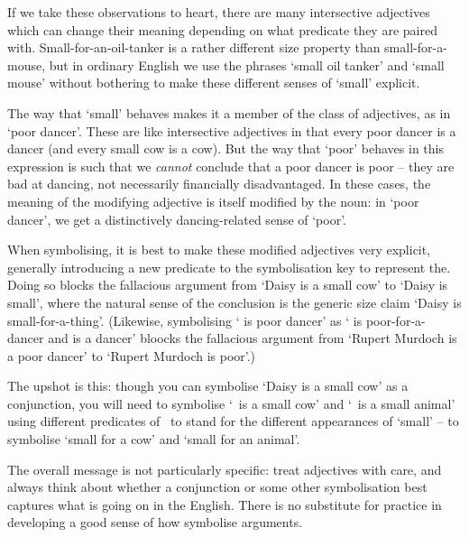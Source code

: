 If we take these observations to heart, there are many intersective adjectives which can change their meaning depending on what predicate they are paired with. Small-for-an-oil-tanker is a rather different size property than small-for-a-mouse, but in ordinary English we use the phrases `small oil tanker' and `small mouse' without bothering to make these different senses of `small' explicit. 

The way that `small' behaves makes it a member of the class of  adjectives, as in `poor dancer'. These are like intersective adjectives in that every poor dancer is a dancer (and every small cow is a cow). But the way that `poor' behaves in this expression is such that we \emph{cannot} conclude that a poor dancer is poor – they are bad at dancing, not necessarily financially disadvantaged. In these cases, the meaning of the modifying adjective is itself modified by the noun: in `poor dancer', we get a distinctively dancing-related sense of `poor'.   

When symbolising, it is best to make these modified adjectives  very explicit, generally introducing a new predicate to the symbolisation key to represent the. Doing so blocks the fallacious argument from `Daisy is a small cow' to `Daisy is small', where the natural sense of the conclusion is the generic size claim `Daisy is small-for-a-thing'. (Likewise, symbolising `\gap{} is poor dancer' as `\gap{} is poor-for-a-dancer and \gap{} is a dancer' bloocks the fallacious argument from `Rupert Murdoch is a poor dancer' to `Rupert Murdoch is poor'.)

The upshot is this: though you can symbolise `Daisy is a small cow' as a conjunction, you will need to symbolise `\blank\ is a small cow' and `\blank\ is a small animal' using different predicates of \FOL\ to stand for the different appearances of `small' – to symbolise `small for a cow' and `small for an animal'. 

The overall message is not particularly specific: treat adjectives with care, and always think about whether a conjunction or some other symbolisation best captures what is going on in the English. There is no substitute for practice in developing a good sense of how symbolise arguments. 

